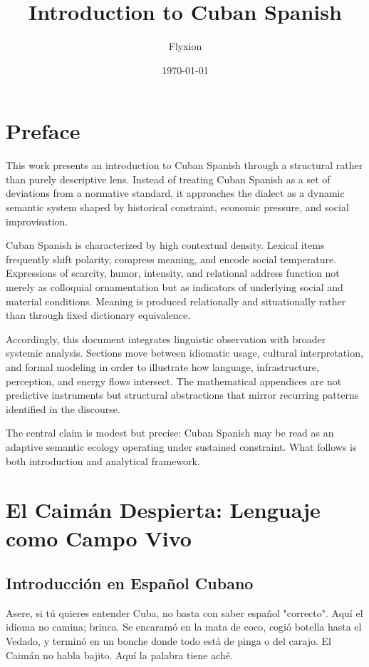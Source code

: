 \documentclass[12pt]{article}
\title{\textbf{Introduction to Cuban Spanish}}
\author{Flyxion}
\date{\today}
\begin{document}
\maketitle

\section*{Preface}

This work presents an introduction to Cuban Spanish through a structural rather than purely descriptive lens. Instead of treating Cuban Spanish as a set of deviations from a normative standard, it approaches the dialect as a dynamic semantic system shaped by historical constraint, economic pressure, and social improvisation.

Cuban Spanish is characterized by high contextual density. Lexical items frequently shift polarity, compress meaning, and encode social temperature. Expressions of scarcity, humor, intensity, and relational address function not merely as colloquial ornamentation but as indicators of underlying social and material conditions. Meaning is produced relationally and situationally rather than through fixed dictionary equivalence.

Accordingly, this document integrates linguistic observation with broader systemic analysis. Sections move between idiomatic usage, cultural interpretation, and formal modeling in order to illustrate how language, infrastructure, perception, and energy flows intersect. The mathematical appendices are not predictive instruments but structural abstractions that mirror recurring patterns identified in the discourse.

The central claim is modest but precise: Cuban Spanish may be read as an adaptive semantic ecology operating under sustained constraint. What follows is both introduction and analytical framework.

\newpage
\section{El Caimán Despierta: Lenguaje como Campo Vivo}

\subsection*{Introducción en Español Cubano}

Asere, si tú quieres entender Cuba, no basta con saber español "correcto". Aquí el idioma no camina; brinca. Se encaramó en la mata de coco, cogió botella hasta el Vedado, y terminó en un bonche donde todo está de pinga o del carajo. El Caimán no habla bajito. Aquí la palabra tiene aché.
\end{document}
